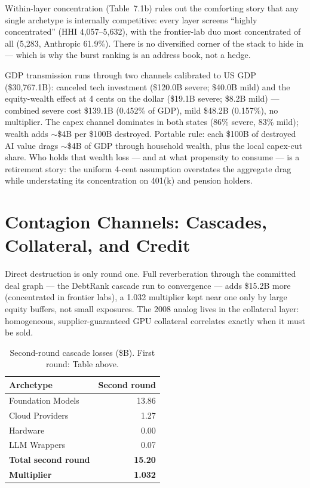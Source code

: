 \documentclass[11pt,a4paper]{article}
\begin{document}
Within-layer concentration (Table~7.1b) rules out the comforting story that
any single archetype is internally competitive: every layer screens
``highly concentrated'' (HHI 4,057--5,632), with the frontier-lab duo most
concentrated of all (5,283, Anthropic 61.9\%). There is no diversified
corner of the stack to hide in --- which is why the burst ranking is an
address book, not a hedge.

GDP transmission runs through two channels calibrated to US GDP
(\$30,767.1B): canceled tech investment (\$120.0B severe; \$40.0B mild) and
the equity-wealth effect at 4 cents on the dollar (\$19.1B severe; \$8.2B
mild) --- combined severe cost \$139.1B (0.452\% of GDP), mild \$48.2B
(0.157\%), no multiplier. The capex channel dominates in both states
(86\% severe, 83\% mild); wealth adds $\sim$\$4B per \$100B destroyed.
Portable rule: each \$100B of destroyed AI value
drags $\sim$\$4B of GDP through household wealth, plus the local capex-cut
share. Who holds that wealth loss --- and at what propensity to consume ---
is a retirement story: the uniform 4-cent assumption overstates the
aggregate drag while understating its concentration on 401(k) and pension
holders.

\section{Contagion Channels: Cascades, Collateral, and Credit}\label{sec:contagion}
Direct destruction is only round one. Full reverberation through the
committed deal graph --- the DebtRank cascade \citep{battiston2012} run to convergence --- adds \$15.2B more (concentrated in frontier labs), a
1.032 multiplier kept near one only by large equity buffers, not small
exposures. The 2008 analog lives in the collateral layer: homogeneous,
supplier-guaranteed GPU collateral correlates exactly when it must be sold.

\begin{table}[htbp]
\centering
\caption{Second-round cascade losses (\$B). First round: Table above.}
    \label{tab:09-secondround-cascade-losses-b}
\begin{tabular}{lr}
\toprule
Archetype & Second round \\
\midrule
Foundation Models & 13.86 \\
Cloud Providers & 1.27 \\
Hardware & 0.00 \\
LLM Wrappers & 0.07 \\
\midrule
\textbf{Total second round} & \textbf{15.20} \\
\textbf{Multiplier} & \textbf{1.032} \\
\bottomrule
\end{tabular}
\end{table}
\end{document}
